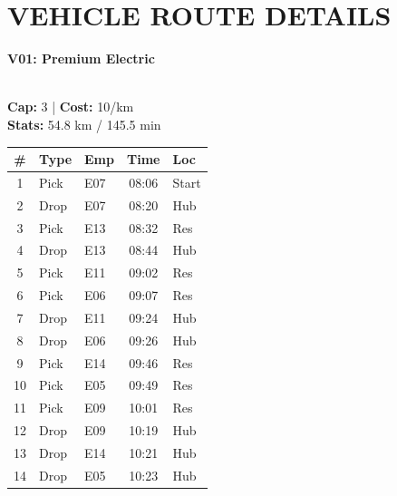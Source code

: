 \documentclass[a4paper,11pt]{article}
\begin{document}
\vspace{0.1cm}

\section*{\textcolor{velorablue}{\uppercase{Vehicle Route Details}}}
\vspace{-0.3cm}

\noindent
\begin{minipage}[t]{0.32\textwidth}
    \centering
    \colorbox{velorablue}{\parbox{\dimexpr\linewidth-2\fboxsep}{\centering \color{white}\textbf{V01: Premium Electric}}} \\
    \vspace{0.05cm}
    {\tiny \textbf{Cap:} 3 | \textbf{Cost:} 10/km \\ \textbf{Stats:} 54.8 km / 145.5 min}
    \vspace{0.05cm}
    
    \renewcommand{\arraystretch}{0.85}
    \setlength{\tabcolsep}{1pt}
    \tiny 
    \begin{tabular}{c l l c l}
        \toprule
        \textbf{\#} & \textbf{Type} & \textbf{Emp} & \textbf{Time} & \textbf{Loc} \\
        \midrule
        1 & Pick & E07 & 08:06 & Start \\
        \rowcolor{headergray} 2 & Drop & E07 & 08:20 & Hub \\
        3 & Pick & E13 & 08:32 & Res \\
        \rowcolor{headergray} 4 & Drop & E13 & 08:44 & Hub \\
        5 & Pick & E11 & 09:02 & Res \\
        \rowcolor{headergray} 6 & Pick & E06 & 09:07 & Res \\
        7 & Drop & E11 & 09:24 & Hub \\
        \rowcolor{headergray} 8 & Drop & E06 & 09:26 & Hub \\
        9 & Pick & E14 & 09:46 & Res \\
        \rowcolor{headergray} 10 & Pick & E05 & 09:49 & Res \\
        11 & Pick & E09 & 10:01 & Res \\
        \rowcolor{headergray} 12 & Drop & E09 & 10:19 & Hub \\
        13 & Drop & E14 & 10:21 & Hub \\
        \rowcolor{headergray} 14 & Drop & E05 & 10:23 & Hub \\
        \bottomrule
    \end{tabular}
\end{minipage}
\end{document}
